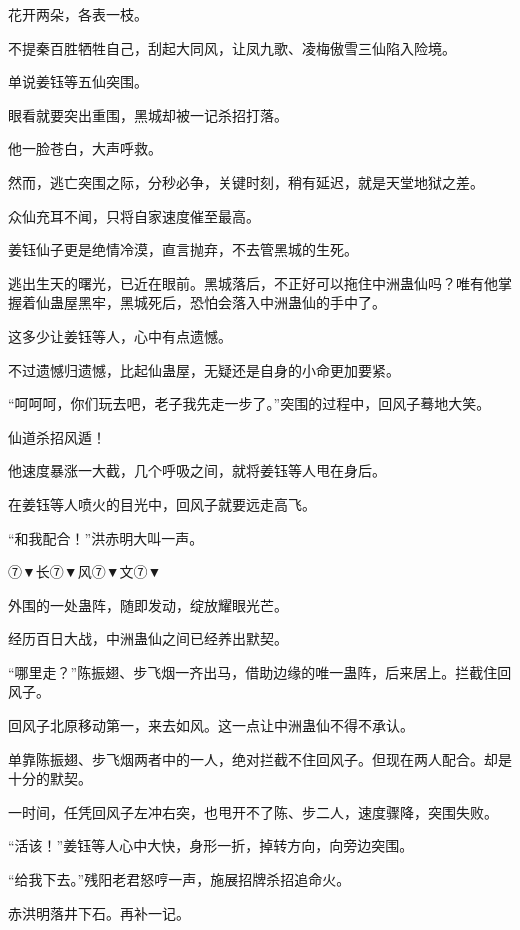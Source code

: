 
\begin{this_body}

花开两朵，各表一枝。

不提秦百胜牺牲自己，刮起大同风，让凤九歌、凌梅傲雪三仙陷入险境。

单说姜钰等五仙突围。

眼看就要突出重围，黑城却被一记杀招打落。

他一脸苍白，大声呼救。

然而，逃亡突围之际，分秒必争，关键时刻，稍有延迟，就是天堂地狱之差。

众仙充耳不闻，只将自家速度催至最高。

姜钰仙子更是绝情冷漠，直言抛弃，不去管黑城的生死。

逃出生天的曙光，已近在眼前。黑城落后，不正好可以拖住中洲蛊仙吗？唯有他掌握着仙蛊屋黑牢，黑城死后，恐怕会落入中洲蛊仙的手中了。

这多少让姜钰等人，心中有点遗憾。

不过遗憾归遗憾，比起仙蛊屋，无疑还是自身的小命更加要紧。

“呵呵呵，你们玩去吧，老子我先走一步了。”突围的过程中，回风子蓦地大笑。

仙道杀招风遁！

他速度暴涨一大截，几个呼吸之间，就将姜钰等人甩在身后。

在姜钰等人喷火的目光中，回风子就要远走高飞。

“和我配合！”洪赤明大叫一声。

⑦▼长⑦▼风⑦▼文⑦▼

外围的一处蛊阵，随即发动，绽放耀眼光芒。

经历百日大战，中洲蛊仙之间已经养出默契。

“哪里走？”陈振翅、步飞烟一齐出马，借助边缘的唯一蛊阵，后来居上。拦截住回风子。

回风子北原移动第一，来去如风。这一点让中洲蛊仙不得不承认。

单靠陈振翅、步飞烟两者中的一人，绝对拦截不住回风子。但现在两人配合。却是十分的默契。

一时间，任凭回风子左冲右突，也甩开不了陈、步二人，速度骤降，突围失败。

“活该！”姜钰等人心中大快，身形一折，掉转方向，向旁边突围。

“给我下去。”残阳老君怒哼一声，施展招牌杀招追命火。

赤洪明落井下石。再补一记。


\end{this_body}
